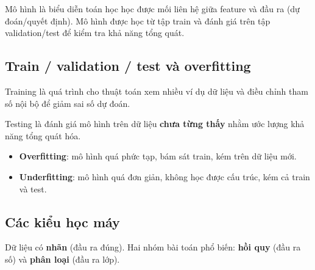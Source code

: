 \begin{dinhnghia}[title={Mô hình (model)}]
Mô hình là biểu diễn toán học học được mối liên hệ giữa feature và đầu ra (dự đoán/quyết định).
Mô hình được học từ tập train và đánh giá trên tập validation/test để kiểm tra khả năng tổng quát.
\end{dinhnghia}

\subsection{Train / validation / test và overfitting}
\label{sec:train-val-test}

\begin{dinhnghia}[title={Huấn luyện (training)}]
Training là quá trình cho thuật toán xem nhiều ví dụ dữ liệu và điều chỉnh tham số nội bộ để giảm sai số dự đoán.
\end{dinhnghia}

\begin{dinhnghia}[title={Kiểm thử (testing)}]
Testing là đánh giá mô hình trên dữ liệu \textbf{chưa từng thấy} nhằm ước lượng khả năng tổng quát hóa.
\end{dinhnghia}

\begin{dinhnghia}[title={Overfitting và Underfitting}]
\begin{itemize}
  \item \textbf{Overfitting}: mô hình quá phức tạp, bám sát train, kém trên dữ liệu mới.
  \item \textbf{Underfitting}: mô hình quá đơn giản, không học được cấu trúc, kém cả train và test.
\end{itemize}
\end{dinhnghia}

\subsection{Các kiểu học máy}
\label{sec:bon-kieu-hoc}

\begin{dinhnghia}[title={Học có giám sát (Supervised)}]
Dữ liệu có \textbf{nhãn} (đầu ra đúng). Hai nhóm bài toán phổ biến:
\textbf{hồi quy} (đầu ra số) và \textbf{phân loại} (đầu ra lớp).
\end{dinhnghia}

\begin{vidu}[title={Minh hoạ supervised}]
\end{vidu}

